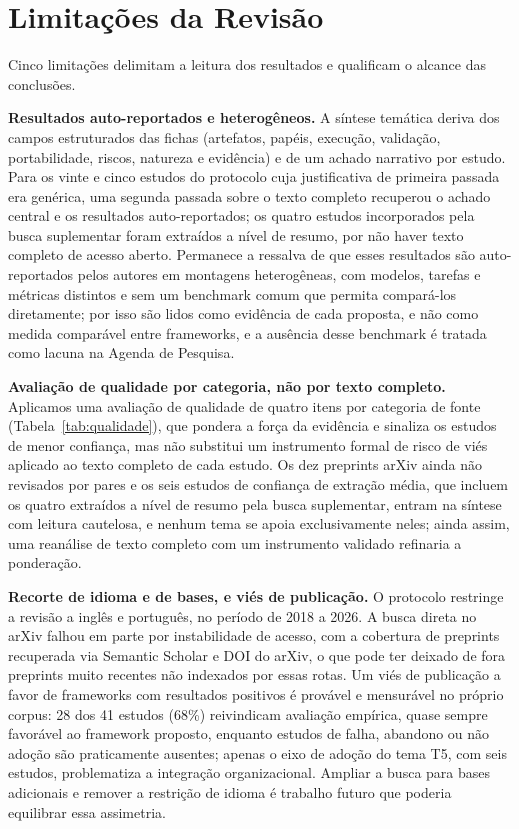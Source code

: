 \section{Limitações da Revisão}

Cinco limitações delimitam a leitura dos resultados e qualificam o alcance das conclusões.

\noindent\textbf{Resultados auto-reportados e heterogêneos.} A síntese temática deriva dos campos estruturados das fichas (artefatos, papéis, execução, validação, portabilidade, riscos, natureza e evidência) e de um achado narrativo por estudo. Para os vinte e cinco estudos do protocolo cuja justificativa de primeira passada era genérica, uma segunda passada sobre o texto completo recuperou o achado central e os resultados auto-reportados; os quatro estudos incorporados pela busca suplementar foram extraídos a nível de resumo, por não haver texto completo de acesso aberto. Permanece a ressalva de que esses resultados são auto-reportados pelos autores em montagens heterogêneas, com modelos, tarefas e métricas distintos e sem um benchmark comum que permita compará-los diretamente; por isso são lidos como evidência de cada proposta, e não como medida comparável entre frameworks, e a ausência desse benchmark é tratada como lacuna na Agenda de Pesquisa.

\noindent\textbf{Avaliação de qualidade por categoria, não por texto completo.} Aplicamos uma avaliação de qualidade de quatro itens por categoria de fonte (Tabela~\ref{tab:qualidade}), que pondera a força da evidência e sinaliza os estudos de menor confiança, mas não substitui um instrumento formal de risco de viés aplicado ao texto completo de cada estudo. Os dez preprints arXiv ainda não revisados por pares e os seis estudos de confiança de extração média, que incluem os quatro extraídos a nível de resumo pela busca suplementar, entram na síntese com leitura cautelosa, e nenhum tema se apoia exclusivamente neles; ainda assim, uma reanálise de texto completo com um instrumento validado refinaria a ponderação.

\noindent\textbf{Recorte de idioma e de bases, e viés de publicação.} O protocolo restringe a revisão a inglês e português, no período de 2018 a 2026. A busca direta no arXiv falhou em parte por instabilidade de acesso, com a cobertura de preprints recuperada via Semantic Scholar e DOI do arXiv, o que pode ter deixado de fora preprints muito recentes não indexados por essas rotas. Um viés de publicação a favor de frameworks com resultados positivos é provável e mensurável no próprio corpus: 28 dos 41 estudos (68\%) reivindicam avaliação empírica, quase sempre favorável ao framework proposto, enquanto estudos de falha, abandono ou não adoção são praticamente ausentes; apenas o eixo de adoção do tema T5, com seis estudos, problematiza a integração organizacional. Ampliar a busca para bases adicionais e remover a restrição de idioma é trabalho futuro que poderia equilibrar essa assimetria.

